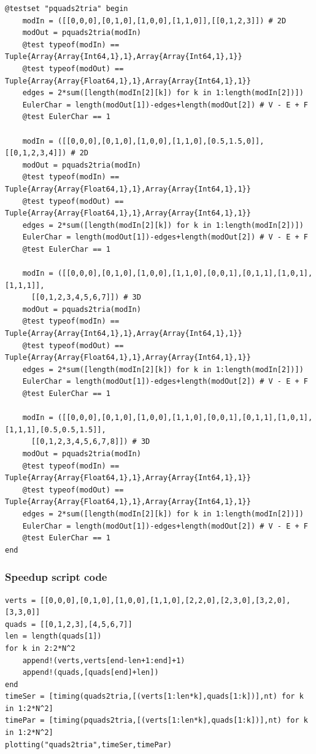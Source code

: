 \documentclass[a4paper,12pt,titlepage]{article}					%
\begin{document}
\begin{Verbatim}
@testset "pquads2tria" begin
	modIn = ([[0,0,0],[0,1,0],[1,0,0],[1,1,0]],[[0,1,2,3]]) # 2D
	modOut = pquads2tria(modIn)
	@test typeof(modIn) == Tuple{Array{Array{Int64,1},1},Array{Array{Int64,1},1}}
	@test typeof(modOut) == Tuple{Array{Array{Float64,1},1},Array{Array{Int64,1},1}}
	edges = 2*sum([length(modIn[2][k]) for k in 1:length(modIn[2])])
	EulerChar = length(modOut[1])-edges+length(modOut[2]) # V - E + F
	@test EulerChar == 1
	
	modIn = ([[0,0,0],[0,1,0],[1,0,0],[1,1,0],[0.5,1.5,0]],[[0,1,2,3,4]]) # 2D
	modOut = pquads2tria(modIn)
	@test typeof(modIn) == Tuple{Array{Array{Float64,1},1},Array{Array{Int64,1},1}}
	@test typeof(modOut) == Tuple{Array{Array{Float64,1},1},Array{Array{Int64,1},1}}
	edges = 2*sum([length(modIn[2][k]) for k in 1:length(modIn[2])])
	EulerChar = length(modOut[1])-edges+length(modOut[2]) # V - E + F
	@test EulerChar == 1
	
	modIn = ([[0,0,0],[0,1,0],[1,0,0],[1,1,0],[0,0,1],[0,1,1],[1,0,1],[1,1,1]],
	  [[0,1,2,3,4,5,6,7]]) # 3D
	modOut = pquads2tria(modIn)
	@test typeof(modIn) == Tuple{Array{Array{Int64,1},1},Array{Array{Int64,1},1}}
	@test typeof(modOut) == Tuple{Array{Array{Float64,1},1},Array{Array{Int64,1},1}}
	edges = 2*sum([length(modIn[2][k]) for k in 1:length(modIn[2])])
	EulerChar = length(modOut[1])-edges+length(modOut[2]) # V - E + F
	@test EulerChar == 1
	
	modIn = ([[0,0,0],[0,1,0],[1,0,0],[1,1,0],[0,0,1],[0,1,1],[1,0,1],[1,1,1],[0.5,0.5,1.5]],
	  [[0,1,2,3,4,5,6,7,8]]) # 3D
	modOut = pquads2tria(modIn)
	@test typeof(modIn) == Tuple{Array{Array{Float64,1},1},Array{Array{Int64,1},1}}
	@test typeof(modOut) == Tuple{Array{Array{Float64,1},1},Array{Array{Int64,1},1}}
	edges = 2*sum([length(modIn[2][k]) for k in 1:length(modIn[2])])
	EulerChar = length(modOut[1])-edges+length(modOut[2]) # V - E + F
	@test EulerChar == 1
end
\end{Verbatim}

\subsubsection{Speedup script code}
\begin{Verbatim}
verts = [[0,0,0],[0,1,0],[1,0,0],[1,1,0],[2,2,0],[2,3,0],[3,2,0],[3,3,0]]
quads = [[0,1,2,3],[4,5,6,7]]
len = length(quads[1])
for k in 2:2*N^2
	append!(verts,verts[end-len+1:end]+1)
	append!(quads,[quads[end]+len])
end
timeSer = [timing(quads2tria,[(verts[1:len*k],quads[1:k])],nt) for k in 1:2*N^2]
timePar = [timing(pquads2tria,[(verts[1:len*k],quads[1:k])],nt) for k in 1:2*N^2]
plotting("quads2tria",timeSer,timePar)
\end{Verbatim}
\end{document}

